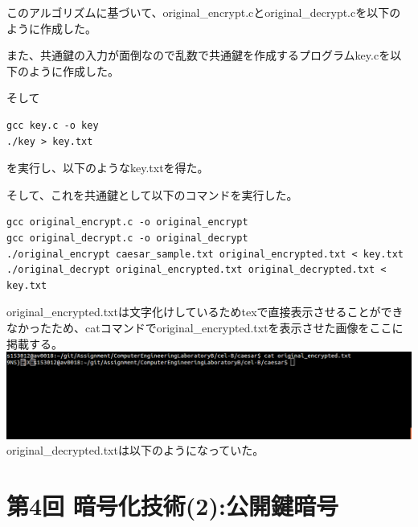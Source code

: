 \documentclass[a4j]{celb-report}
\begin{document}
このアルゴリズムに基づいて、original\_encrypt.cとoriginal\_decrypt.cを以下のように作成した。


また、共通鍵の入力が面倒なので乱数で共通鍵を作成するプログラムkey.cを以下のように作成した。

そして
\begin{lstlisting}[basicstyle=\ttfamily\footnotesize, frame=single]
gcc key.c -o key
./key > key.txt
\end{lstlisting}
を実行し、以下のようなkey.txtを得た。

そして、これを共通鍵として以下のコマンドを実行した。
\begin{lstlisting}[basicstyle=\ttfamily\footnotesize, frame=single]
gcc original_encrypt.c -o original_encrypt
gcc original_decrypt.c -o original_decrypt
./original_encrypt caesar_sample.txt original_encrypted.txt < key.txt
./original_decrypt original_encrypted.txt original_decrypted.txt < key.txt
\end{lstlisting}
original\_encrypted.txtは文字化けしているためtexで直接表示させることができなかったため、catコマンドでoriginal\_encrypted.txtを表示させた画像をここに掲載する。\\
\includegraphics[width=15cm]{../caesar/original_encrypted.png}\\
original\_decrypted.txtは以下のようになっていた。\\


\newpage
\section{第4回 暗号化技術(2):公開鍵暗号}
\end{document}

